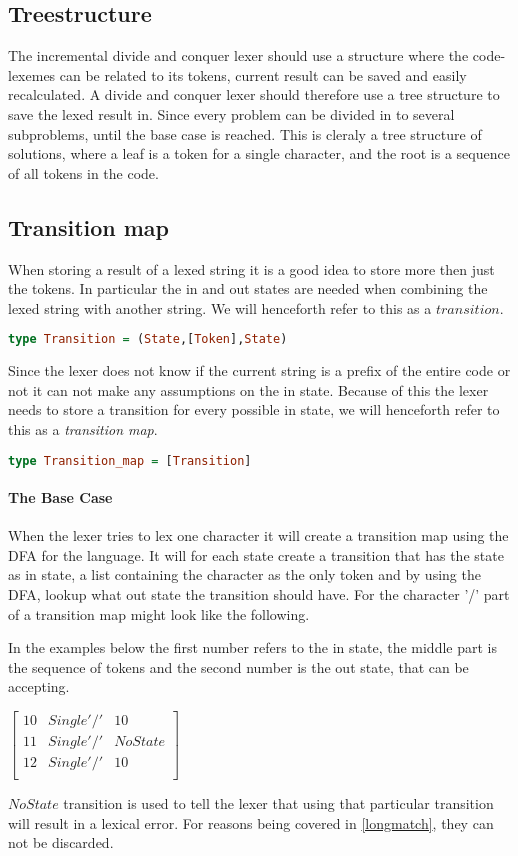 \subsection{Treestructure}
The incremental divide and conquer lexer should use a structure where the
code-lexemes can be related to its tokens, current result can be saved and
easily recalculated. A divide and conquer lexer should therefore use a tree
structure to save the lexed result in. Since every problem can be divided in to
several subproblems, until the base case is reached. This is cleraly a tree
structure of solutions, where a leaf is a token for a single character, and the
root is a sequence of all tokens in the code.  

\subsection{Transition map}
When storing a result of a lexed string it is a good idea to store more then
just the tokens. In particular the in and out states are needed when combining
the lexed string with another string. We will henceforth refer to this as a
$transition$.
\begin{lstlisting}[language=Haskell]
type Transition = (State,[Token],State)
\end{lstlisting}
Since the lexer does not know if the current string is a prefix of the entire
code or not it can not make any assumptions on the in state. Because of this the
lexer needs to store a transition for every possible in state, we will henceforth
refer to this as a \emph{transition map}.
\begin{lstlisting}[language=Haskell]
type Transition_map = [Transition]
\end{lstlisting}
\paragraph{The Base Case}
When the lexer tries to lex one character it will create a transition
map using the DFA for the language. It will for each state create a transition
that has the state as in state, a list containing the character as the only
token and by using the DFA, lookup what out state the transition should have.
For the character '/' part of a transition map might look like the following.

In the
examples below the first number refers to the in state, the middle part is the
sequence of tokens and the second number is the out state, that can be accepting.
\begin{center}
$\left[\begin{array}{ccc}
10&Single '/'&10\\
11&Single '/'&NoState\\
12&Single '/'&10\\
\end{array}\right]$
\end{center}
$NoState$ transition is used to tell the lexer that using that particular 
transition will result in a lexical error. For reasons being covered in
\cref{longmatch}, they can not be discarded.

